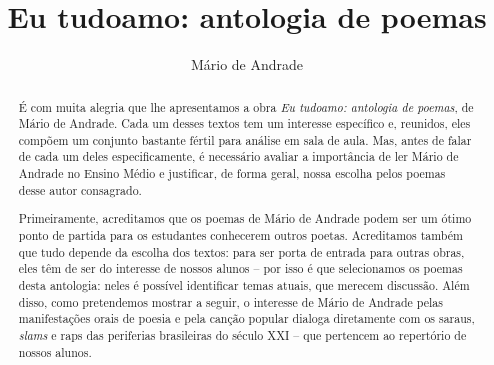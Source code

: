 \documentclass[11pt]{extarticle}
\begin{document}
\newcommand{\AutorLivro}{Mário de Andrade}
\newcommand{\TituloLivro}{Eu tudoamo: antologia de poemas}
\newcommand{\Tema}{Ficção, mistério e fantasia}
\newcommand{\Genero}{Poema}
\newcommand{\imagemCapa}{./images/PNLD0005-01.png}
\newcommand{\issnppub}{---}
\newcommand{\issnepub}{---}
\newcommand{\colaborador}{Carlos Rogério Duarte Barreiros}


\title{\TituloLivro}
\author{\AutorLivro}
\def\authornotes{\colaborador}

\date{}
\maketitle


\begin{abstract}

É com muita alegria que lhe apresentamos a obra \emph{Eu tudoamo: antologia de poemas},	
de Mário de Andrade. Cada um desses textos tem um
interesse específico e, reunidos, eles compõem um conjunto bastante
fértil para análise em sala de aula. Mas, antes de falar de cada um
deles especificamente, é necessário avaliar a importância de ler Mário
de Andrade no Ensino Médio e justificar, de forma geral, nossa escolha
pelos poemas desse autor consagrado.

Primeiramente, acreditamos que os poemas de Mário de Andrade podem ser
um ótimo ponto de partida para os estudantes conhecerem outros poetas.
Acreditamos também que tudo depende da escolha dos textos: para ser
porta de entrada para outras obras, eles têm de ser do interesse de
nossos alunos -- por isso é que selecionamos os poemas desta antologia:
neles é possível identificar temas atuais, que merecem discussão. Além
disso, como pretendemos mostrar a seguir, o interesse de Mário de
Andrade pelas manifestações orais de poesia e pela canção popular
dialoga diretamente com os saraus, \emph{slams} e raps das periferias
brasileiras do século XXI -- que pertencem ao repertório de nossos
alunos.


\end{abstract}
\end{document}
